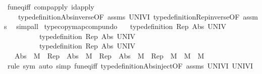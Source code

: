 \begin{isabellebody}
\ fun{\isacharunderscore}{\kern0pt}eq{\isacharunderscore}{\kern0pt}iff\ comp{\isacharunderscore}{\kern0pt}apply\ id{\isacharunderscore}{\kern0pt}apply\isanewline
\ \ \ \ type{\isacharunderscore}{\kern0pt}definition{\isachardot}{\kern0pt}Abs{\isacharunderscore}{\kern0pt}inverse{\isacharbrackleft}{\kern0pt}OF\ assms\ UNIV{\isacharunderscore}{\kern0pt}I{\isacharbrackright}{\kern0pt}\ type{\isacharunderscore}{\kern0pt}definition{\isachardot}{\kern0pt}Rep{\isacharunderscore}{\kern0pt}inverse{\isacharbrackleft}{\kern0pt}OF\ assms{\isacharbrackright}{\kern0pt}\ \isamarkupfalse%
\ simp{\isacharunderscore}{\kern0pt}all%
\endisatagproof
{\isafoldproof}%
%
\isadelimproof
\isanewline
%
\endisadelimproof
\isanewline
{}\isamarkupfalse%
\ type{\isacharunderscore}{\kern0pt}copy{\isacharunderscore}{\kern0pt}map{\isacharunderscore}{\kern0pt}comp{}{\isacharunderscore}{\kern0pt}undo{\isacharcolon}{\kern0pt}\isanewline
\ \ \ {\isachardoublequoteopen}type{\isacharunderscore}{\kern0pt}definition\ Rep\ Abs\ UNIV{\isachardoublequoteclose}\isanewline
\ \ \ \ \ \ \ \ \ \ {\isachardoublequoteopen}type{\isacharunderscore}{\kern0pt}definition\ Rep{\isacharprime}{\kern0pt}\ Abs{\isacharprime}{\kern0pt}\ UNIV{\isachardoublequoteclose}\isanewline
\ \ \ \ \ \ \ \ \ \ {\isachardoublequoteopen}type{\isacharunderscore}{\kern0pt}definition\ Rep{\isacharprime}{\kern0pt}{\isacharprime}{\kern0pt}\ Abs{\isacharprime}{\kern0pt}{\isacharprime}{\kern0pt}\ UNIV{\isachardoublequoteclose}\isanewline
\ \ \ {\isachardoublequoteopen}Abs{\isacharprime}{\kern0pt}\ {\isasymcirc}\ M\ {\isasymcirc}\ Rep{\isacharprime}{\kern0pt}{\isacharprime}{\kern0pt}\ {\isacharequal}{\kern0pt}\ {\isacharparenleft}{\kern0pt}Abs{\isacharprime}{\kern0pt}\ {\isasymcirc}\ M{}\ {\isasymcirc}\ Rep{\isacharparenright}{\kern0pt}\ {\isasymcirc}\ {\isacharparenleft}{\kern0pt}Abs\ {\isasymcirc}\ M{}\ {\isasymcirc}\ Rep{\isacharprime}{\kern0pt}{\isacharprime}{\kern0pt}{\isacharparenright}{\kern0pt}\ {\isasymLongrightarrow}\ M{}\ {\isasymcirc}\ M{}\ {\isacharequal}{\kern0pt}\ M{\isachardoublequoteclose}\isanewline
%
\isadelimproof
\ \ %
\endisadelimproof
%
\isatagproof
{}\isamarkupfalse%
\ {\isacharparenleft}{\kern0pt}rule\ sym{\isacharparenright}{\kern0pt}\ {\isacharparenleft}{\kern0pt}auto\ simp{\isacharcolon}{\kern0pt}\ fun{\isacharunderscore}{\kern0pt}eq{\isacharunderscore}{\kern0pt}iff\ type{\isacharunderscore}{\kern0pt}definition{\isachardot}{\kern0pt}Abs{\isacharunderscore}{\kern0pt}inject{\isacharbrackleft}{\kern0pt}OF\ assms{\isacharparenleft}{\kern0pt}{}{\isacharparenright}{\kern0pt}\ UNIV{\isacharunderscore}{\kern0pt}I\ UNIV{\isacharunderscore}{\kern0pt}I{\isacharbrackright}{\kern0pt}\isanewline

\end{isabellebody}
